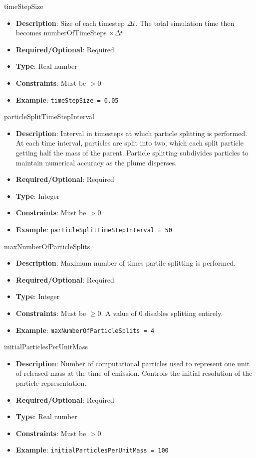 timeStepSize
\vspace{\the\parameterListSpacing}
\begin{itemize}
    \item {\bf Description}: Size of each timestep $\Delta t$. The total simulation time then becomes numberOfTimeSteps $\times \Delta t$ .
    \item {\bf Required/Optional}: Required
    \item {\bf Type}: Real number
    \item {\bf Constraints}: Must be $> 0$
    \item {\bf Example}: \lstinline!timeStepSize = 0.05!
\end{itemize}

particleSplitTimeStepInterval
\vspace{\the\parameterListSpacing}
\begin{itemize}
    \item {\bf Description}: Interval in timesteps at which particle splitting is performed. At each time interval, 
        particles are split into two, which each split particle getting half the mass of the parent. 
        Particle splitting subdivides particles to maintain numerical accuracy as the plume disperses.
    \item {\bf Required/Optional}: Required
    \item {\bf Type}: Integer
    \item {\bf Constraints}: Must be $> 0$
    \item {\bf Example}: \lstinline!particleSplitTimeStepInterval = 50!
\end{itemize}

maxNumberOfParticleSplits
\vspace{\the\parameterListSpacing}
\begin{itemize}
    \item {\bf Description}: Maximum number of times partile splitting is performed.
    \item {\bf Required/Optional}: Required
    \item {\bf Type}: Integer
    \item {\bf Constraints}: Must be $\geq 0$. A value of 0 disables splitting entirely.
    \item {\bf Example}: \lstinline!maxNumberOfParticleSplits = 4!
\end{itemize}

initialParticlesPerUnitMass
\vspace{\the\parameterListSpacing}
\begin{itemize}
    \item {\bf Description}: Number of computational particles used to represent one unit of released mass at the time of emission. Controls the initial resolution of the particle representation.
    \item {\bf Required/Optional}: Required
    \item {\bf Type}: Real number
    \item {\bf Constraints}: Must be $> 0$
    \item {\bf Example}: \lstinline!initialParticlesPerUnitMass = 100!
\end{itemize}
